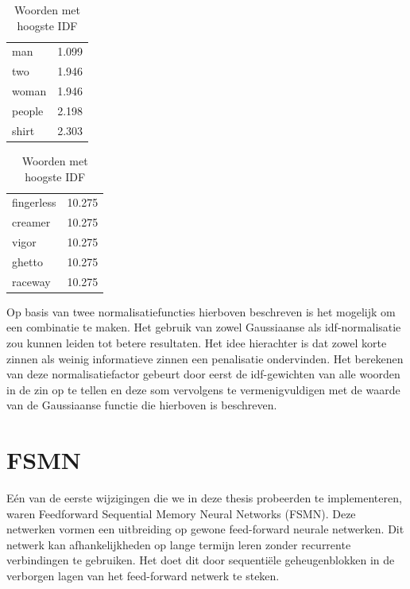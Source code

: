 \begin{table}[!htb]
	\caption{Gestemde woorden samen met hun IDF-gewicht}
	\begin{minipage}{.5\linewidth}
		\caption{Woorden met laagste IDF}
		\label{tbl:idf-laag}
		\centering
		\begin{tabular}{ll}
    man    & 1.099 \\
    two    & 1.946 \\
    woman  & 1.946 \\
    people & 2.198 \\
    shirt  & 2.303 \\
		\end{tabular}
	\end{minipage}%
	\begin{minipage}{.5\linewidth}
		\centering
		\caption{Woorden met hoogste IDF}
		\label{tbl-idf-hoog}
		\begin{tabular}{ll}
	fingerless & 10.275\\
	creamer& 10.275\\
	vigor& 10.275\\
	ghetto& 10.275\\
	raceway& 10.275\\
		\end{tabular}
	\end{minipage} 
\end{table}

Op basis van twee normalisatiefuncties hierboven beschreven is het mogelijk om een combinatie te maken. Het gebruik van zowel Gaussiaanse als idf-normalisatie zou kunnen leiden tot betere resultaten. Het idee hierachter is dat zowel korte zinnen als weinig informatieve zinnen een penalisatie ondervinden. Het berekenen van deze normalisatiefactor gebeurt door eerst de idf-gewichten van alle woorden in de zin op te tellen en deze som vervolgens te vermenigvuldigen met de waarde van de Gaussiaanse functie die hierboven is beschreven.

\section{FSMN}
E\'en van de eerste wijzigingen die we in deze thesis probeerden te implementeren, waren Feedforward Sequential Memory Neural Networks (FSMN)\cite{Zhang}. Deze netwerken vormen een uitbreiding op gewone feed-forward neurale netwerken. Dit netwerk kan afhankelijkheden op lange termijn leren zonder recurrente verbindingen te gebruiken. Het doet dit door sequenti\"ele geheugenblokken in de verborgen lagen van het feed-forward netwerk te steken. 

